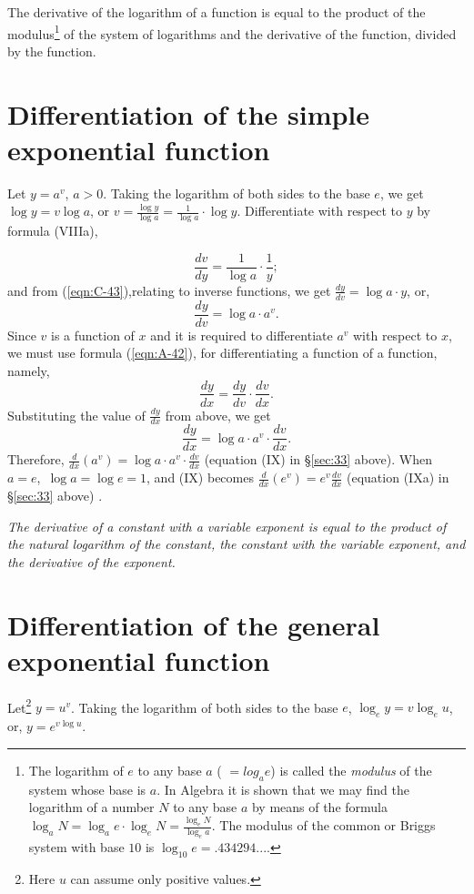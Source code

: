 The derivative of the logarithm of a function is equal to the product of 
the modulus\footnote{The logarithm of $e$ to any base $a$ ( $= log_ae$) is 
called the {\it modulus} of the system whose base is $a$. In Algebra it is 
shown that we may find the logarithm of a number $N$ to any base $a$ by means of the formula
$
    \log_a N = \log_a e \cdot \log_e N = \frac{\log_e N}{\log_e a}.
$
The modulus of the common or Briggs system with base $10$ is
$\log_{10}e = .434294...$.}
of the system of logarithms and the derivative of the function, divided by the function.

\section{Differentiation of the simple exponential function}

Let $y 	= a^v$, \qquad $a > 0$.
Taking the logarithm of both sides to the base $e$, we get
$\log y = v \log a$,
or $v 	= \frac{\log y}{\log a}	= \frac{1}{\log a} \cdot \log y$.
Differentiate with respect to $y$ by formula (VIIIa),

\[
  	\frac{dv}{dy} 	= \frac{1}{\log a} \cdot \frac{1}{y};
\]
and from (\ref{eqn:C-43}),relating to inverse functions, we get
$  	\frac{dy}{dv} 	= \log a \cdot y$,
or,
\[
 	\frac{dy}{dv} 	= \log a \cdot a^v.
\]
Since $v$ is a function of $x$ and it is required to differentiate 
$a^v$ with respect to $x$, we must use formula (\ref{eqn:A-42}), 
for differentiating a function of a function, namely,
\[
  	\frac{dy}{dx} 	= \frac{dy}{dv} \cdot \frac{dv}{dx}.
\]
Substituting the value of $\frac{dy}{dx}$ from %
above, %
we get
\[
  	\frac{dy}{dx} 	= \log a \cdot a^v \cdot \frac{dv}{dx}.
\]
Therefore, $\frac{d}{dx} (a^v) 	= \log a \cdot a^v \cdot \frac{dv}{dx}$
(equation (IX) in \S \ref{sec:33}  above).
When $a = e$,\ $\log a = \log e = 1$, and (IX) becomes
$\frac{d}{dx} (e^v) 	= e^v \frac{dv}{dx}$ (equation (IXa) in \S \ref{sec:33} above) .

{\it The derivative of a constant with a variable exponent is equal to the 
product of the natural logarithm of the constant, the constant with the 
variable exponent, and the derivative of the exponent.}

\section{Differentiation of the general exponential function}
\label{sec:46}

Let\footnote{Here $u$ can assume only positive values.}
$ y 	= u^v$.
Taking the logarithm of both sides to the base $e$,
$\log_e y= v \log_e u$, or, $y 	= e^{v \log u}$.

